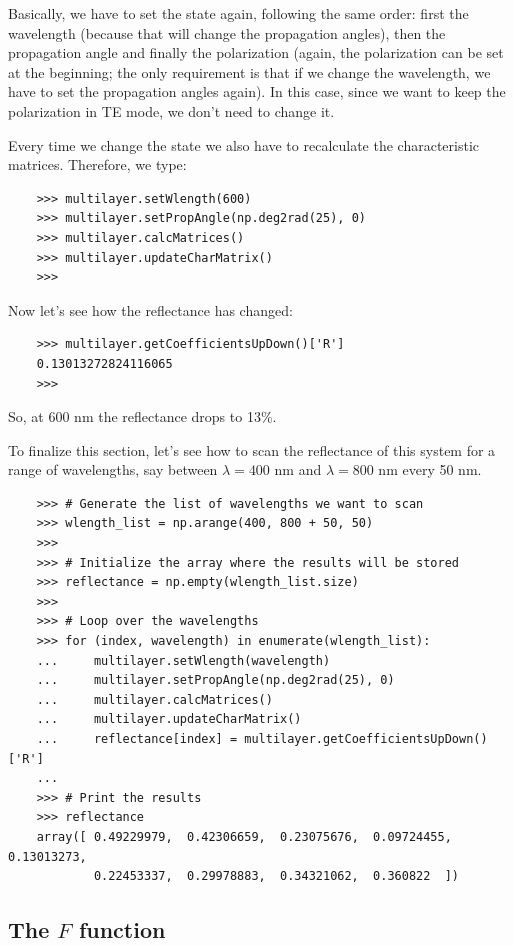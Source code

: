 \documentclass[a4paper,11pt,aps,final]{revtex4}
\begin{document}
Basically, we have to set the state again, following the same order: first the wavelength (because that will change the propagation angles), then the propagation angle and finally the polarization (again, the polarization can be set at the beginning; the only requirement is that if we change the wavelength, we have to set the propagation angles again). In this case, since we want to keep the polarization in TE mode, we don't need to change it.

Every time we change the state we also have to recalculate the characteristic matrices. Therefore, we type:

\begin{verbatim}
    >>> multilayer.setWlength(600)
    >>> multilayer.setPropAngle(np.deg2rad(25), 0)
    >>> multilayer.calcMatrices()
    >>> multilayer.updateCharMatrix()
    >>>
\end{verbatim}

Now let's see how the reflectance has changed:

\begin{verbatim}
    >>> multilayer.getCoefficientsUpDown()['R']
    0.13013272824116065
    >>>
\end{verbatim}

So, at 600 nm the reflectance drops to 13\%.

To finalize this section, let's see how to scan the reflectance of this system for a range of wavelengths, say between $\lambda = 400$ nm and $\lambda = 800$ nm every 50 nm.

\begin{verbatim}
    >>> # Generate the list of wavelengths we want to scan
    >>> wlength_list = np.arange(400, 800 + 50, 50)
    >>>
    >>> # Initialize the array where the results will be stored
    >>> reflectance = np.empty(wlength_list.size)
    >>>
    >>> # Loop over the wavelengths
    >>> for (index, wavelength) in enumerate(wlength_list):
    ...     multilayer.setWlength(wavelength)
    ...     multilayer.setPropAngle(np.deg2rad(25), 0)
    ...     multilayer.calcMatrices()
    ...     multilayer.updateCharMatrix()
    ...     reflectance[index] = multilayer.getCoefficientsUpDown()['R']
    ...
    >>> # Print the results
    >>> reflectance
    array([ 0.49229979,  0.42306659,  0.23075676,  0.09724455,  0.13013273,
            0.22453337,  0.29978883,  0.34321062,  0.360822  ])
\end{verbatim}

\subsection{The $F$ function} \label{sub:ffunction}
\end{document}
